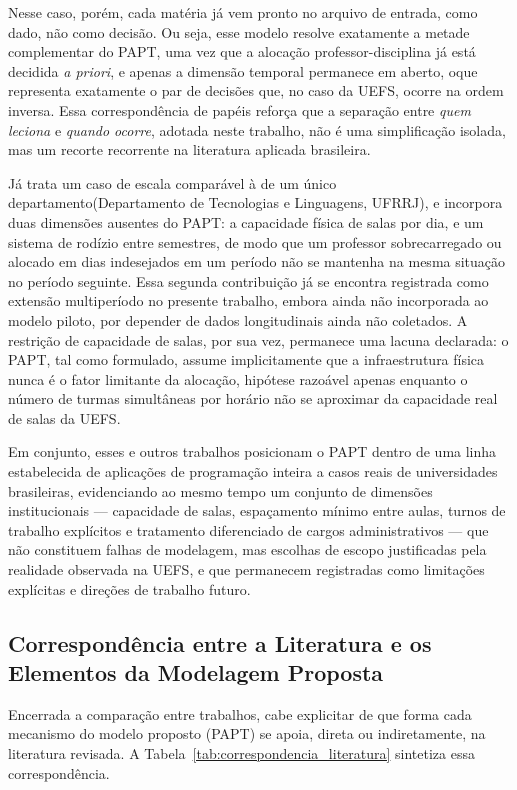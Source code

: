 \documentclass[11pt,a4paper]{article}
\begin{document}
Nesse caso, porém, cada matéria já vem pronto no arquivo de entrada, como dado, não como decisão. Ou seja, esse modelo resolve exatamente a metade complementar do PAPT, uma vez que a alocação professor-disciplina já está decidida \textit{a priori}, e apenas a dimensão temporal permanece em aberto, oque representa exatamente o par de decisões que, no caso da UEFS, ocorre na ordem inversa. Essa correspondência de papéis reforça que a separação entre \emph{quem leciona} e \emph{quando ocorre}, adotada neste trabalho, não é uma simplificação isolada, mas um recorte recorrente na literatura aplicada brasileira.

Já \cite{souzafilho2009} trata um caso de escala comparável à de um único departamento(Departamento de Tecnologias e Linguagens, UFRRJ), e incorpora duas dimensões ausentes do PAPT: a capacidade física de salas por dia, e um sistema de rodízio entre semestres, de modo que um professor sobrecarregado ou alocado em dias indesejados em um período
não se mantenha na mesma situação no período seguinte. Essa segunda contribuição já se encontra registrada como extensão multiperíodo no presente trabalho, embora ainda não incorporada ao modelo piloto, por depender de dados longitudinais ainda não coletados. A restrição de capacidade de salas, por sua vez, permanece uma lacuna declarada: o PAPT,
tal como formulado, assume implicitamente que a infraestrutura física nunca é o fator limitante da alocação, hipótese razoável apenas enquanto o número de turmas simultâneas por horário não se aproximar da capacidade real de salas da UEFS.


Em conjunto, esses e outros trabalhos posicionam o PAPT dentro de uma linha estabelecida
de aplicações de programação inteira a casos reais de universidades brasileiras,
evidenciando ao mesmo tempo um conjunto de dimensões institucionais --- capacidade de
salas, espaçamento mínimo entre aulas, turnos de trabalho explícitos e tratamento
diferenciado de cargos administrativos --- que não constituem falhas de modelagem, mas
escolhas de escopo justificadas pela realidade observada na UEFS, e que permanecem registradas como limitações explícitas e direções de
trabalho futuro.


\subsection{Correspondência entre a Literatura e os Elementos da Modelagem Proposta}

Encerrada a comparação entre trabalhos, cabe explicitar de que forma cada mecanismo do
modelo proposto (PAPT) se apoia, direta ou indiretamente, na literatura revisada. A
Tabela~\ref{tab:correspondencia_literatura} sintetiza essa correspondência.
\end{document}
